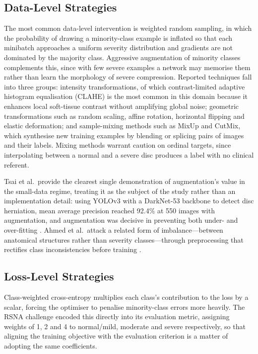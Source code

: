 \subsection{Data-Level Strategies}
\label{sec:lr-data-level}

The most common data-level intervention is weighted random sampling, in which
the probability of drawing a minority-class example is inflated so that each
minibatch approaches a uniform severity distribution and gradients are not
dominated by the majority class. Aggressive augmentation of minority classes
complements this, since with few severe examples a network may memorise them
rather than learn the morphology of severe compression. Reported techniques fall
into three groups: intensity transformations, of which contrast-limited adaptive
histogram equalisation (CLAHE) is the most common in this domain because it
enhances local soft-tissue contrast without amplifying global noise; geometric
transformations such as random scaling, affine rotation, horizontal flipping and
elastic deformation; and sample-mixing methods such as MixUp and CutMix, which
synthesise new training examples by blending or splicing pairs of images and
their labels. Mixing methods warrant caution on ordinal targets, since
interpolating between a normal and a severe disc produces a label with no
clinical referent.

Tsai et al.\ provide the clearest single demonstration of augmentation's value
in the small-data regime, treating it as the subject of the study rather than an
implementation detail: using YOLOv3 with a DarkNet-53 backbone to detect disc
herniation, mean average precision reached 92.4\% at 550 images with
augmentation, and augmentation was decisive in preventing both under- and
over-fitting \cite{tsai2021lumbar}. Ahmed et al.\ attack a related form of
imbalance---between anatomical structures rather than severity classes---through
preprocessing that rectifies class inconsistencies before training
\cite{ahmed2024pioneering}.

\subsection{Loss-Level Strategies}
\label{sec:lr-loss-level}

Class-weighted cross-entropy multiplies each class's contribution to the loss by
a scalar, forcing the optimiser to penalise minority-class errors more heavily.
The RSNA challenge encoded this directly into its evaluation metric, assigning
weights of 1, 2 and 4 to normal/mild, moderate and severe respectively, so that
aligning the training objective with the evaluation criterion is a matter of
adopting the same coefficients.

